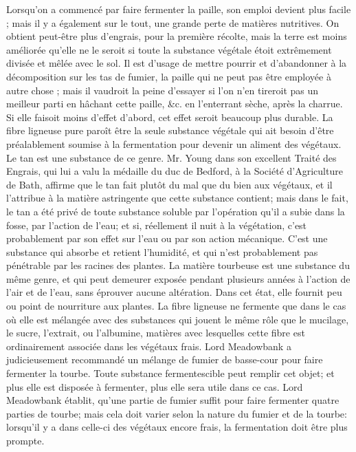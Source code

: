 Lorsqu'on a commencé par faire fermenter la paille, son emploi devient plus facile ; mais il y a également sur le tout, une grande perte de matières nutritives. On obtient peut-être plus d'engrais, pour la première récolte, mais la terre est moins améliorée qu'elle ne le seroit si toute la substance végétale étoit extrêmement divisée et mêlée avec le sol.
Il est d'usage de mettre pourrir et d'abandonner à la décomposition sur les tas de fumier, la paille qui ne peut pas être employée à autre chose ; mais il vaudroit la peine d'essayer si l'on n'en tireroit pas un meilleur parti en hâchant cette paille, &c. en l'enterrant sèche, après la charrue. Si elle faisoit moins d'effet d'abord, cet effet seroit beaucoup plus durable.\setcounter{page}{164} La fibre ligneuse pure paroît être la seule substance végétale qui ait besoin d'être préalablement soumise à la fermentation pour devenir un aliment des végétaux. Le tan est une substance de ce genre. Mr. Young dans son excellent Traité des Engrais, qui lui a valu la médaille du duc de Bedford, à la Société d'Agriculture de Bath, affirme que le tan fait plutôt du mal que du bien aux végétaux, et il l'attribue à la matière astringente que cette substance contient; mais dans le fait, le tan a été privé de toute substance soluble par l'opération qu'il a subie dans la fosse, par l'action de l'eau; et si, réellement il nuit à la végétation, c'est probablement par son effet sur l'eau ou par son action mécanique. C'est une substance qui absorbe et retient l'humidité, et qui n'est probablement pas pénétrable par les racines des plantes.
La matière tourbeuse est une substance du même genre, et qui peut demeurer exposée pendant plusieurs années à l'action de l'air et de l'eau, sans éprouver aucune altération. Dans cet état, elle fournit peu ou point de nourriture aux plantes.
La fibre ligneuse ne fermente que dans le cas où elle est mélangée avec des substances\setcounter{page}{165} qui jouent le même rôle que le mucilage, le sucre, l'extrait, ou l'albumine, matières avec lesquelles cette fibre est ordinairement associée dans les végétaux frais. Lord Meadowbank a judicieusement recommandé un mélange de fumier de basse-cour pour faire fermenter la tourbe. Toute substance fermentescible peut remplir cet objet; et plus elle est disposée à fermenter, plus elle sera utile dans ce cas.
Lord Meadowbank établit, qu'une partie de fumier suffit pour faire fermenter quatre parties de tourbe; mais cela doit varier selon la nature du fumier et de la tourbe: lorsqu'il y a dans celle-ci des végétaux encore frais, la fermentation doit être plus prompte.
